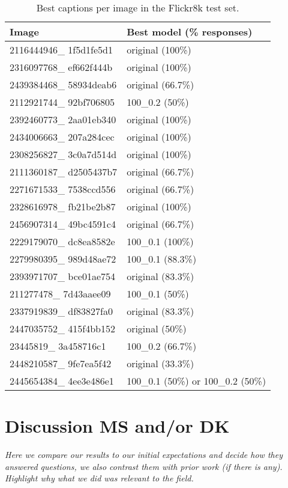 \documentclass[11pt]{article}
\begin{document}
\begin{table}[h]
\begin{center}
\begin{tabular}{|p{2cm}|p{3.5cm}|}
\hline \bf Image & \bf Best model (\% responses) \\ \hline
2116444946\_ 1f5d1fe5d1 & original (100\%)  \\
2316097768\_ ef662f444b & original (100\%)  \\
2439384468\_ 58934deab6 & original (66.7\%)  \\
2112921744\_ 92bf706805 & 100\_0.2 (50\%)  \\
2392460773\_ 2aa01eb340 & original (100\%) \\
2434006663\_ 207a284cec & original (100\%) \\
2308256827\_ 3c0a7d514d & original (100\%) \\
2111360187\_ d2505437b7 & original (66.7\%) \\
2271671533\_ 7538ccd556 & original (66.7\%)  \\
2328616978\_ fb21be2b87 & original (100\%)  \\
2456907314\_ 49bc4591c4 & original (66.7\%)  \\
2229179070\_ dc8ea8582e & 100\_0.1 (100\%)  \\
2279980395\_ 989d48ae72 & 100\_0.1 (88.3\%)  \\
2393971707\_ bce01ae754 & original (83.3\%)   \\
211277478\_ 7d43aaee09 & 100\_0.1 (50\%) \\
2337919839\_ df83827fa0 & original (83.3\%) \\
2447035752\_ 415f4bb152 & original (50\%) \\
23445819\_ 3a458716c1 & 100\_0.2 (66.7\%) \\
2448210587\_ 9fe7ea5f42 & original (33.3\%) \\
2445654384\_ 4ee3e486e1 & 100\_0.1 (50\%) or 100\_0.2 (50\%)\\
\hline
\end{tabular}
\end{center}
\caption{\label{flickr-table} Best captions per image in the Flickr8k test set. }
\end{table}

\section{Discussion \textbf{MS and/or DK}}

\textit{Here we compare our results to our initial expectations and decide how they answered questions, we also contrast them with prior work (if there is any). Highlight why what we did was relevant to the field.}
\end{document}
